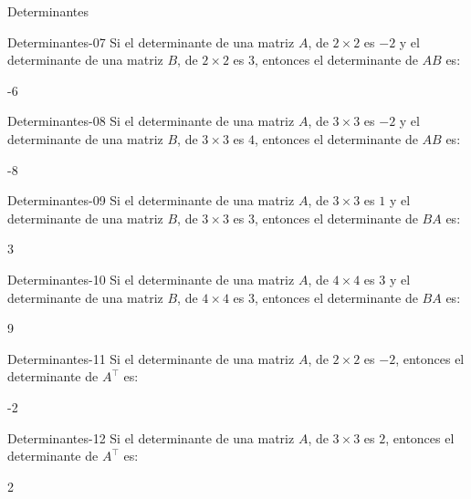 \documentclass[a4,11pt]{aleph-notas}
\begin{document}
\begin{quiz}{Determinantes}
\begin{numerical}[tolerance=0.01]%
    {Determinantes-07}
    Si el determinante de una matriz $A$, de $2\times 2$ es $-2$ y el determinante de una matriz $B$, de $2\times 2$ es $3$, entonces el determinante de $AB$ es:
    \item -6
\end{numerical}

\begin{numerical}[tolerance=0.01]%
    {Determinantes-08}
    Si el determinante de una matriz $A$, de $3\times 3$ es $-2$ y el determinante de una matriz $B$, de $3\times 3$ es $4$, entonces el determinante de $AB$ es:
    \item -8
\end{numerical}

\begin{numerical}[tolerance=0.01]%
    {Determinantes-09}
    Si el determinante de una matriz $A$, de $3\times 3$ es $1$ y el determinante de una matriz $B$, de $3\times 3$ es $3$, entonces el determinante de $BA$ es:
    \item 3
\end{numerical}

\begin{numerical}[tolerance=0.01]%
    {Determinantes-10}
    Si el determinante de una matriz $A$, de $4\times 4$ es $3$ y el determinante de una matriz $B$, de $4\times 4$ es $3$, entonces el determinante de $BA$ es:
    \item 9
\end{numerical}

\begin{numerical}[tolerance=0.01]%
    {Determinantes-11}
    Si el determinante de una matriz $A$, de $2\times 2$ es $-2$, entonces el determinante de $A^\intercal$ es:
    \item -2
\end{numerical}

\begin{numerical}[tolerance=0.01]%
    {Determinantes-12}
    Si el determinante de una matriz $A$, de $3\times 3$ es $2$, entonces el determinante de $A^\intercal$ es:
    \item 2
\end{numerical}


\end{quiz}
\end{document}
